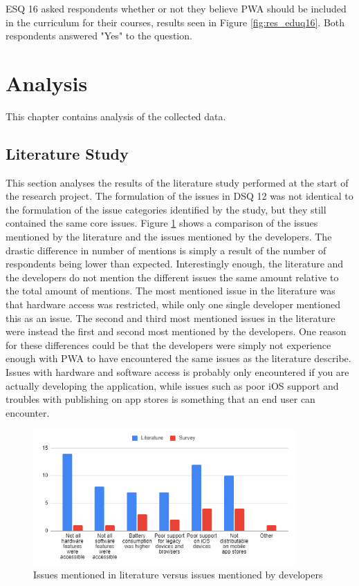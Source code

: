 \documentclass[a4paper,12pt]{article}
\renewcommand{\arraystretch}{1.5}
\begin{document}
ESQ 16 asked respondents whether or not they believe PWA should be included in the curriculum for their courses, results seen in Figure \ref{fig:res_eduq16}. Both respondents answered "Yes" to the question.

\setlength{\arrayrulewidth}{0.5mm}
\setlength{\tabcolsep}{8pt}
\renewcommand{\arraystretch}{1.5}
\newpage

\section{Analysis}
\label{Analysis}
This chapter contains analysis of the collected data.

\subsection{Literature Study}
\label{Analysis_study}
This section analyses the results of the literature study performed at the start of the research project. The formulation of the issues in DSQ 12 was not identical to the formulation of the issue categories identified by the study, but they still contained the same core issues. Figure \ref{fig:analysis_issues} shows a comparison of the issues mentioned by the literature and the issues mentioned by the developers. The drastic difference in number of mentions is simply a result of the number of respondents being lower than expected. Interestingly enough, the literature and the developers do not mention the different issues the same amount relative to the total amount of mentions. The most mentioned issue in the literature was that hardware access was restricted, while only one single developer mentioned this as an issue. The second and third most mentioned issues in the literature were instead the first and second most mentioned by the developers. One reason for these differences could be that the developers were simply not experience enough with PWA to have encountered the same issues as the literature describe. Issues with hardware and software access is probably only encountered if you are actually developing the application, while issues such as poor iOS support and troubles with publishing on app stores is something that an end user can encounter.

\begin{figure}[ht!]
    \centering
    \includegraphics[width=10cm]{img/Analysis/issues.png}
    \caption{Issues mentioned in literature versus issues mentioned by developers}
    \label{fig:analysis_issues}
\end{figure}
\end{document}
